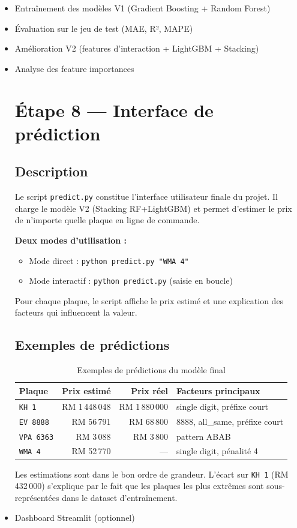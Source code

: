 \documentclass[12pt, a4paper]{article}
\begin{document}
\begin{itemize}[leftmargin=2cm]
  \item[$\boxtimes$] Entraînement des modèles V1 (Gradient Boosting + Random Forest)
  \item[$\boxtimes$] Évaluation sur le jeu de test (MAE, R², MAPE)
  \item[$\boxtimes$] Amélioration V2 (features d'interaction + LightGBM + Stacking)
  \item[$\boxtimes$] Analyse des feature importances
\section{Étape 8 — Interface de prédiction}
\label{sec:predict}

\subsection{Description}

Le script \texttt{predict.py} constitue l'interface utilisateur finale du projet. Il charge le modèle V2 (Stacking RF+LightGBM) et permet d'estimer le prix de n'importe quelle plaque en ligne de commande.

\textbf{Deux modes d'utilisation :}
\begin{itemize}
  \item Mode direct : \texttt{python predict.py "WMA 4"}
  \item Mode interactif : \texttt{python predict.py} (saisie en boucle)
\end{itemize}

Pour chaque plaque, le script affiche le prix estimé et une explication des facteurs qui influencent la valeur.

\subsection{Exemples de prédictions}

\begin{table}[H]
\centering
\begin{tabular}{lrrl}
\toprule
\textbf{Plaque} & \textbf{Prix estimé} & \textbf{Prix réel} & \textbf{Facteurs principaux} \\
\midrule
\texttt{KH 1}    & RM 1\,448\,048 & RM 1\,880\,000 & single digit, préfixe court \\
\texttt{EV 8888} & RM 56\,791     & RM 68\,800     & 8888, all\_same, préfixe court \\
\texttt{VPA 6363}& RM 3\,088      & RM 3\,800      & pattern ABAB \\
\texttt{WMA 4}   & RM 52\,770     & —              & single digit, pénalité 4 \\
\bottomrule
\end{tabular}
\caption{Exemples de prédictions du modèle final}
\end{table}

Les estimations sont dans le bon ordre de grandeur. L'écart sur \texttt{KH 1} (RM 432\,000) s'explique par le fait que les plaques les plus extrêmes sont sous-représentées dans le dataset d'entraînement.
  \item[$\square$] Dashboard Streamlit (optionnel)
\end{itemize}
\end{document}
